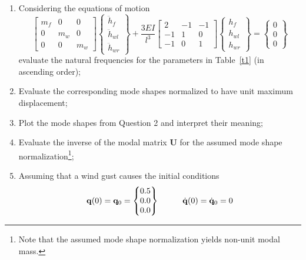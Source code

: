 \documentclass[11pt,a4paper]{article}
\begin{document}
%
\begin{enumerate}
	\item Considering the equations of motion 
	\begin{equation} \label{e1}
		\begin{bmatrix}
			m_f & 0 & 0 \\
			0 & m_w & 0 \\
			0 & 0 & m_w 
		\end{bmatrix}
		\begin{Bmatrix}
			\ddot{h}_f \\
			\ddot{h}_{wl} \\
			\ddot{h}_{wr}
		\end{Bmatrix}
		+ 
		\frac{3EI}{l^3}
		\begin{bmatrix}
			2 & -1 & -1 \\
			-1 & 1 & 0 \\
			-1 & 0 & 1
		\end{bmatrix}
		\begin{Bmatrix}
			h_f \\
			h_{wl} \\
			h_{wr}			
		\end{Bmatrix}
		= 
		\begin{Bmatrix}
			0 \\
			0 \\
			0			
		\end{Bmatrix}
	\end{equation}
	evaluate the natural frequencies for the parameters in Table~\ref{t1} (in ascending order);
	\item Evaluate the corresponding mode shapes normalized to have unit maximum displacement;
	\item Plot the mode shapes from Question 2 and interpret their meaning;
	\item Evaluate the inverse of the modal matrix $\mathbf{U}$ for the assumed mode shape normalization\footnote{Note that the assumed mode shape normalization yields non-unit modal mass.};
	\item Assuming that a wind gust causes the initial conditions
	\begin{equation} \label{e2}
		\mathbf{q}(0) = \mathbf{q}_0 = 
		\begin{Bmatrix}
			0.5 \\ 
			0.0 \\
			0.0 \\
		\end{Bmatrix}
		\hspace{10mm}
		\dot{\mathbf{q}}(0) = \dot{\mathbf{q}}_0 = 0

\end{equation}
\end{enumerate}
\end{document}
